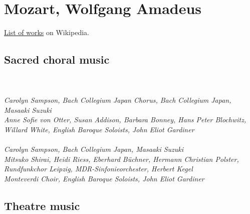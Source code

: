 \chapter{Mozart, Wolfgang Amadeus}
\label{cha:mozart}

\href{https://en.wikipedia.org/wiki/List_of_compositions_by_Wolfgang_Amadeus_Mozart}{List of works} on Wikipedia.

\section{Sacred choral music} %
\label{sec:sacred_choral_music}

 \\

 \\ 

 \textit{Carolyn Sampson, Bach Collegium Japan Chorus, Bach Collegium Japan, Masaaki Suzuki}\marginnote{} \\ 

 \textit{Anne Sofie von Otter, Susan Addison, Barbara Bonney, Hans Peter Blochwitz, Willard White, English Baroque Soloists, John Eliot Gardiner}\marginnote{} \\

 \\

 \textit{Carolyn Sampson, Bach Collegium Japan, Masaaki Suzuki}\marginnote{} \\

 \textit{Mitsuko Shirai, Heidi Riess, Eberhard Büchner, Hermann Christian Polster, Rundfunkchor Leipzig, MDR-Sinfonieorchester, Herbert Kegel} \\

 \textit{Monteverdi Choir, English Baroque Soloists, John Eliot Gardiner}\marginnote{} \\   



\section{Theatre music} %
\label{sec:theatre_music}

